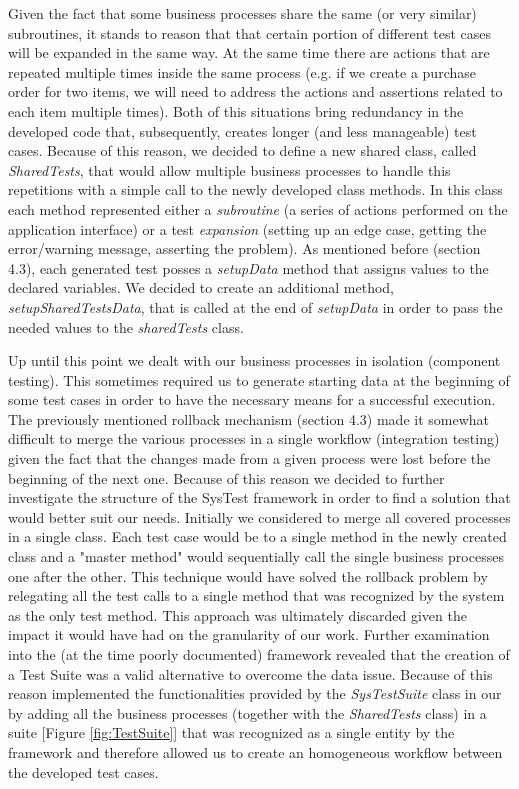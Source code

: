 Given the fact that some business processes share the same (or very similar) subroutines, it stands to reason that that certain portion of different test cases will be expanded in the same way. At the same time there are actions that are repeated multiple times inside the same process (e.g. if we create a purchase order for two items, we will need to address the actions and assertions related to each item multiple times). Both of this situations bring redundancy in the developed code that, subsequently, creates longer (and less manageable) test cases. Because of this reason, we decided to define a new shared class, called \textit{SharedTests}, that would allow multiple business processes to handle this repetitions with a simple call to the newly developed class methods. In this class each method represented either a \textit{subroutine} (a series of actions performed on the application interface) or a test \textit{expansion} (setting up an edge case, getting the error/warning message, asserting the problem). As mentioned before (section 4.3), each generated test posses a \textit{setupData} method that assigns values to the declared variables. We decided to create an additional method, \textit{setupSharedTestsData}, that is called at the end of \textit{setupData} in order to pass the needed values to the \textit{sharedTests} class. 

Up until this point we dealt with our business processes in isolation (component testing). This sometimes required us to generate starting data at the beginning of some test cases in order to have the necessary means for a successful execution. The previously mentioned rollback mechanism (section 4.3) made it somewhat difficult to merge the various processes in a single workflow (integration testing) given the fact that the changes made from a given process were lost before the beginning of the next one. Because of this reason we decided to further investigate the structure of the SysTest framework in order to find a solution that would better suit our needs. Initially we considered to merge all covered processes in a single class. Each test case would be to a single method in the newly created class and a "master method" would sequentially call the single business processes one after the other. This technique would have solved the rollback problem by relegating all the test calls to a single method that was recognized by the system as the only test method. This approach was ultimately discarded given the impact it would have had on the granularity of our work. Further examination into the (at the time poorly documented) framework revealed that the creation of a Test Suite was a valid alternative to overcome the data issue. Because of this reason implemented the functionalities provided by the \textit{SysTestSuite} class in our by adding all the business processes (together with the \textit{SharedTests} class) in a suite [Figure \ref{fig:TestSuite}] that was recognized as a single entity by the framework and therefore allowed us to create an homogeneous workflow between the developed test cases.

